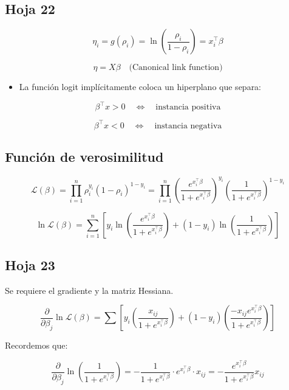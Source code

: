 \documentclass[12pt]{article}
\begin{document}
\subsection{Hoja 22}

\[
\eta_i = g(\rho_i) = \ln \left( \frac{\rho_i}{1 - \rho_i} \right) = x_i^\top \beta
\]

\[
\eta = X \beta \quad \text{(Canonical link function)}
\]

\begin{itemize}
    \item La función logit implícitamente coloca un hiperplano que separa:
\end{itemize}

\[
\beta^\top x > 0 \quad \Longleftrightarrow \quad \text{instancia positiva}
\]

\[
\beta^\top x < 0 \quad \Longleftrightarrow \quad \text{instancia negativa}
\]

\subsection*{Función de verosimilitud}

\[
\mathcal{L}(\beta) = \prod_{i=1}^{n} \rho_i^{y_i} (1 - \rho_i)^{1 - y_i}
= \prod_{i=1}^{n} \left( \frac{e^{x_i^\top \beta}}{1 + e^{x_i^\top \beta}} \right)^{y_i}
\left( \frac{1}{1 + e^{x_i^\top \beta}} \right)^{1 - y_i}
\]

\[
\ln \mathcal{L}(\beta) =
\sum_{i=1}^{n} \left[
y_i \ln \left( \frac{e^{x_i^\top \beta}}{1 + e^{x_i^\top \beta}} \right)
+ (1 - y_i) \ln \left( \frac{1}{1 + e^{x_i^\top \beta}} \right)
\right]
\]
\subsection{Hoja 23}
Se requiere el gradiente y la matriz Hessiana.

\medskip

\[
\frac{\partial}{\partial \beta_j} \ln \mathcal{L}(\beta)
= \sum \left[ y_i \left( \frac{x_{ij}}{1 + e^{x_i^\top \beta}} \right)
+ (1 - y_i) \left( \frac{-x_{ij} e^{x_i^\top \beta}}{1 + e^{x_i^\top \beta}} \right) \right]
\]

\medskip

Recordemos que:

\[
\frac{\partial}{\partial \beta_j} \ln \left( \frac{1}{1 + e^{x_i^\top \beta}} \right)
= - \frac{1}{1 + e^{x_i^\top \beta}} \cdot e^{x_i^\top \beta} \cdot x_{ij}
= - \frac{e^{x_i^\top \beta}}{1 + e^{x_i^\top \beta}} x_{ij}
\]
\end{document}
